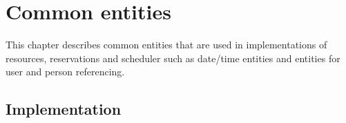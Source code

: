 \chapter{Common entities}

This chapter describes common entities that are used in implementations of resources, reservations and scheduler such as date/time entities and entities for user and person referencing.

\section{Implementation}


